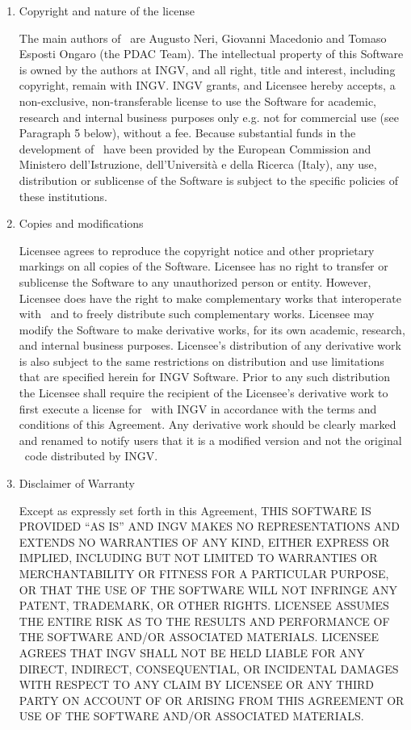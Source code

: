 \begin{enumerate}
\item Copyright and nature of the license

The main authors of \PDAC\ are Augusto Neri, Giovanni Macedonio and Tomaso Esposti Ongaro (the PDAC Team). The intellectual property of this Software is owned by the authors at INGV, and all right, title and interest, including copyright, remain with INGV. INGV grants, and Licensee hereby accepts, a non-exclusive, non-transferable license to use the Software for academic, research and internal business purposes only e.g. not for commercial use (see Paragraph 5 below), without a fee. 
Because substantial funds in the development of \PDAC\ have been provided by the European Commission  and Ministero dell’Istruzione, dell’Universit\`a e della Ricerca (Italy), any use, distribution or sublicense of the Software is subject to the specific policies of these institutions.

\item Copies and modifications

Licensee agrees to reproduce the copyright notice and other proprietary markings on all copies of the Software. Licensee has no right to transfer or sublicense the Software to any unauthorized person or entity. However, Licensee does have the right to make complementary works that interoperate with \PDAC\ and to freely distribute such complementary works.
Licensee may modify the Software to make derivative works, for its own academic, research, and internal business purposes. Licensee’s distribution of any derivative work is also subject to the same restrictions on distribution and use limitations that are speciﬁed herein for INGV Software. Prior to any such distribution the Licensee shall require the recipient of the Licensee’s derivative work to first execute a license for \PDAC\ with INGV in accordance with the terms and conditions of this Agreement. Any derivative work should be clearly marked and renamed to notify users that it is a modiﬁed version and not the original \PDAC\ code distributed by INGV. 

\item Disclaimer of Warranty

Except as expressly set forth in this Agreement, THIS SOFTWARE IS PROVIDED “AS IS” AND INGV MAKES NO REPRESENTATIONS AND EXTENDS NO WARRANTIES OF ANY KIND, EITHER EXPRESS OR IMPLIED, INCLUDING BUT NOT LIMITED TO WARRANTIES OR MERCHANTABILITY OR FITNESS FOR A PARTICULAR PURPOSE, OR THAT THE USE OF THE SOFTWARE WILL NOT INFRINGE ANY PATENT, TRADEMARK, OR OTHER RIGHTS. LICENSEE ASSUMES THE ENTIRE RISK AS TO THE RESULTS AND PERFORMANCE OF THE SOFTWARE AND/OR ASSOCIATED MATERIALS. LICENSEE AGREES THAT INGV SHALL NOT BE HELD LIABLE FOR ANY DIRECT, INDIRECT, CONSEQUENTIAL, OR INCIDENTAL DAMAGES WITH RESPECT TO ANY CLAIM BY LICENSEE OR ANY THIRD PARTY ON ACCOUNT OF OR ARISING FROM THIS AGREEMENT OR USE OF THE SOFTWARE AND/OR ASSOCIATED MATERIALS. 


\end{enumerate}
